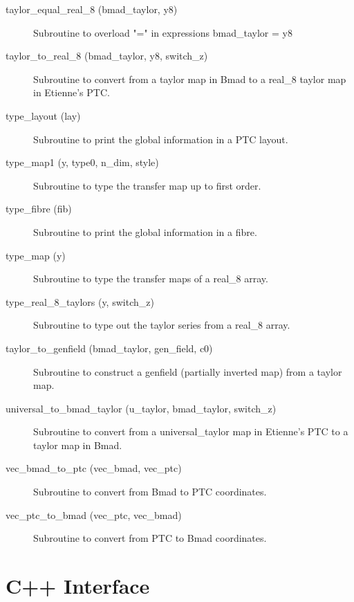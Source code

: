 \begin{description}
\item[taylor\_equal\_real\_8 (bmad\_taylor, y8)] \Newline
Subroutine to overload "=" in expressions bmad\_taylor = y8 

\item[taylor\_to\_real\_8 (bmad\_taylor, y8, switch\_z)] \Newline
Subroutine to convert from a taylor map in Bmad to a real\_8 taylor map in Etienne's PTC. 

\item[type\_layout (lay)] \Newline
Subroutine to print the global information in a PTC layout.

\item[type\_map1 (y, type0, n\_dim, style)] \Newline
Subroutine to type the transfer map up to first order. 

\item[type\_fibre (fib)] \Newline
Subroutine to print the global information in a fibre.

\item[type\_map (y)] \Newline
Subroutine to type the transfer maps of a real\_8 array. 

\item[type\_real\_8\_taylors (y, switch\_z)] \Newline
Subroutine to type out the taylor series from a real\_8 array. 

\item[taylor\_to\_genfield (bmad\_taylor, gen\_field, c0)] \Newline
Subroutine to construct a genfield (partially inverted map) from a taylor map. 

\item[universal\_to\_bmad\_taylor (u\_taylor, bmad\_taylor, switch\_z)] \Newline
Subroutine to convert from a universal\_taylor map in Etienne's PTC to a taylor map in Bmad. 

\item[vec\_bmad\_to\_ptc (vec\_bmad, vec\_ptc)] \Newline
Subroutine to convert from Bmad to PTC coordinates. 

\item[vec\_ptc\_to\_bmad (vec\_ptc, vec\_bmad)] \Newline
Subroutine to convert from PTC to Bmad coordinates. 

\end{description}

\section{C++ Interface}
\label{r:cpp}      

